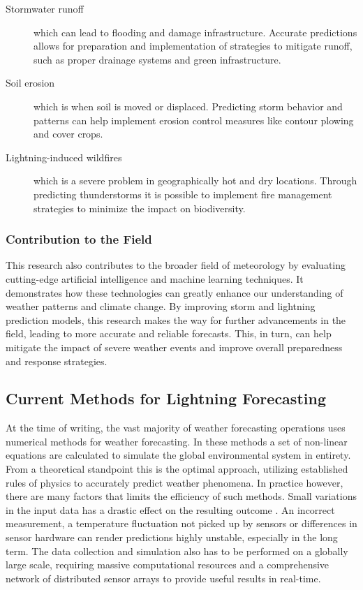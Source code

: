 \begin{description}
	\item[Stormwater runoff] which can lead to flooding and damage infrastructure. Accurate predictions allows for preparation and implementation of strategies to mitigate runoff, such as proper drainage systems and green infrastructure.
	\item[Soil erosion] which is when soil is moved or displaced. Predicting storm behavior and patterns can help implement erosion control measures like contour plowing and cover crops.
	\item[Lightning-induced wildfires] which is a severe problem in geographically hot and dry locations. Through predicting thunderstorms it is possible to implement fire management strategies to minimize the impact on biodiversity.
\end{description}

\subsubsection{Contribution to the Field}

This research also contributes to the broader field of meteorology by evaluating cutting-edge artificial intelligence and machine learning techniques. It demonstrates how these technologies can greatly enhance our understanding of weather patterns and climate change. By improving storm and lightning prediction models, this research makes the way for further advancements in the field, leading to more accurate and reliable forecasts. This, in turn, can help mitigate the impact of severe weather events and improve overall preparedness and response strategies.

\subsection{Current Methods for Lightning Forecasting}

At the time of writing, the vast majority of weather forecasting operations uses numerical methods \cite{bib7} for weather forecasting. In these methods a set of non-linear equations are calculated to simulate the global environmental system in entirety. From a theoretical standpoint this is the optimal approach, utilizing established rules of physics to accurately predict weather phenomena. In practice however, there are many factors that limits the efficiency of such methods. Small variations in the input data has a drastic effect on the resulting outcome \cite{bib8}. An incorrect measurement, a temperature fluctuation not picked up by sensors or differences in sensor hardware can render predictions highly unstable, especially in the long term. The data collection and simulation also has to be performed on a globally large scale, requiring massive computational resources and a comprehensive network of distributed sensor arrays to provide useful results in real-time.

